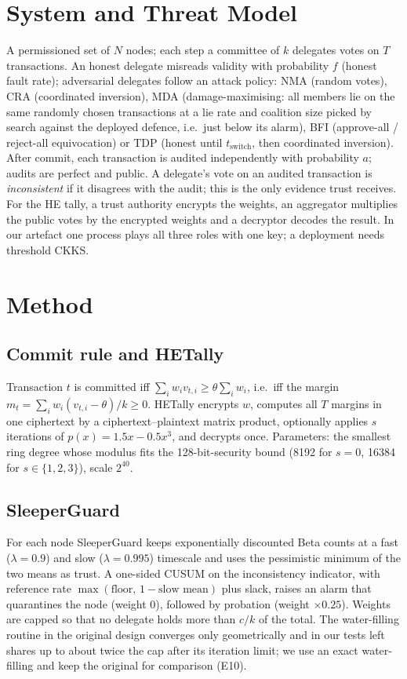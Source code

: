 \documentclass[conference]{IEEEtran}
\begin{document}
\section{System and Threat Model}
A permissioned set of $N$ nodes; each step a committee of $k$ delegates votes on $T$ transactions.
An honest delegate misreads validity with probability $f$ (honest fault rate); adversarial delegates
follow an attack policy: NMA (random votes), CRA (coordinated inversion), MDA (damage-maximising: all members
lie on the same randomly chosen transactions at a lie rate and coalition size picked by search against the
deployed defence, i.e.\ just below its alarm), BFI (approve-all / reject-all equivocation) or TDP (honest until
$t_{\text{switch}}$, then coordinated inversion). After commit, each transaction is audited independently
with probability $a$; audits are perfect and public. A delegate's vote on an audited transaction is
\emph{inconsistent} if it disagrees with the audit; this is the only evidence trust receives.
For the HE tally, a trust authority encrypts the weights, an aggregator multiplies the public votes by the
encrypted weights and a decryptor decodes the result. In our artefact one process plays all three
roles with one key; a deployment needs threshold CKKS.

\section{Method}
\subsection{Commit rule and HETally}
Transaction $t$ is committed iff $\sum_i w_i v_{t,i}\ge\theta\sum_i w_i$, i.e.\ iff the margin
$m_t=\sum_i w_i(v_{t,i}-\theta)/k\ge 0$. HETally encrypts $w$, computes all $T$ margins in one ciphertext
by a ciphertext--plaintext matrix product, optionally applies $s$ iterations of $p(x)=1.5x-0.5x^3$, and
decrypts once. Parameters: the smallest ring degree whose modulus fits the 128-bit-security bound (8192 for
$s=0$, 16384 for $s\in\{1,2,3\}$), scale $2^{40}$.

\subsection{SleeperGuard}
For each node SleeperGuard keeps exponentially discounted Beta counts at a fast ($\lambda=0.9$) and slow
($\lambda=0.995$) timescale and uses the pessimistic minimum of the two means as trust. A one-sided CUSUM
on the inconsistency indicator, with reference rate $\max(\text{floor},\,1-\text{slow mean})$ plus slack,
raises an alarm that quarantines the node (weight 0), followed by probation (weight $\times0.25$).
Weights are capped so that no delegate holds more than $c/k$ of the total. The water-filling routine in the
original design converges only geometrically and in our tests left shares up to about twice the cap after its
iteration limit; we use an exact water-filling and keep the original for comparison (E10).
\end{document}

